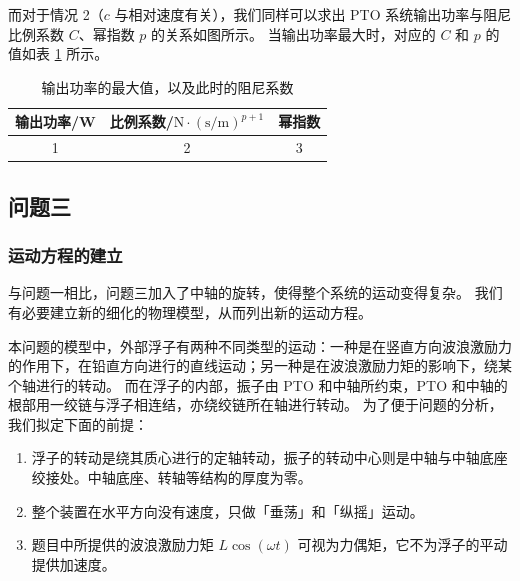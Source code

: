 而对于情况 2（$c$ 与相对速度有关），我们同样可以求出 PTO 系统输出功率与阻尼比例系数 $C$、幂指数 $p$ 的关系如图所示。
当输出功率最大时，对应的 $C$ 和 $p$ 的值如表 \ref{answer-2-2} 所示。

\begin{table}[htbp]
    \centering
    \begin{tabular}{ccc}
        \toprule
        输出功率/W & 比例系数/$\mathrm{N}\cdot(\mathrm{s}/\mathrm{m})^{p+1}$ & 幂指数 \\
        \midrule
        1 & 2 & 3 \\
        \bottomrule
    \end{tabular}
    \caption{输出功率的最大值，以及此时的阻尼系数}
    \label{answer-2-2}
\end{table}

\subsection{问题三}

\subsubsection{运动方程的建立}

与问题一相比，问题三加入了中轴的旋转，使得整个系统的运动变得复杂。
我们有必要建立新的细化的物理模型，从而列出新的运动方程。

本问题的模型中，外部浮子有两种不同类型的运动：一种是在竖直方向波浪激励力的作用下，在铅直方向进行的直线运动；另一种是在波浪激励力矩的影响下，绕某个轴进行的转动。
而在浮子的内部，振子由 PTO 和中轴所约束，PTO 和中轴的根部用一绞链与浮子相连结，亦绕绞链所在轴进行转动。
为了便于问题的分析，我们拟定下面的前提：
\begin{enumerate}
    \item 浮子的转动是绕其质心进行的定轴转动，振子的转动中心则是中轴与中轴底座绞接处。中轴底座、转轴等结构的厚度为零。
    \item 整个装置在水平方向没有速度，只做「垂荡」和「纵摇」运动。
    \item 题目中所提供的波浪激励力矩 $L\cos(\omega t)$ 可视为力偶矩，它不为浮子的平动提供加速度。
\end{enumerate}

